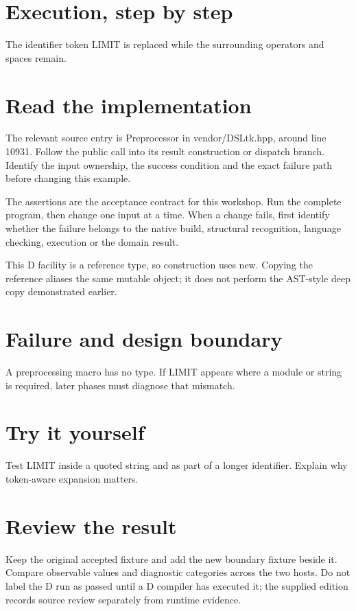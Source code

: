 
\section*{Execution, step by step}
The identifier token LIMIT is replaced while the surrounding operators and spaces remain.

\section*{Read the implementation}
The relevant source entry is Preprocessor in vendor/DSLtk.hpp, around line 10931. Follow the public call into its result construction or dispatch branch. Identify the input ownership, the success condition and the exact failure path before changing this example.

The assertions are the acceptance contract for this workshop. Run the complete program, then change one input at a time. When a change fails, first identify whether the failure belongs to the native build, structural recognition, language checking, execution or the domain result.

\clearpage
{}
This D facility is a reference type, so construction uses new. Copying the reference aliases the same mutable object; it does not perform the AST-style deep copy demonstrated earlier.


\section*{Failure and design boundary}
A preprocessing macro has no type. If LIMIT appears where a module or string is required, later phases must diagnose that mismatch.

\section*{Try it yourself}
Test LIMIT inside a quoted string and as part of a longer identifier. Explain why token-aware expansion matters.

\section*{Review the result}
Keep the original accepted fixture and add the new boundary fixture beside it. Compare observable values and diagnostic categories across the two hosts. Do not label the D run as passed until a D compiler has executed it; the supplied edition records source review separately from runtime evidence.

